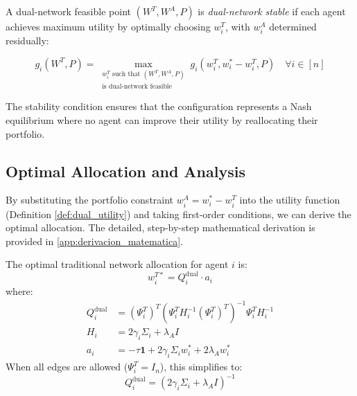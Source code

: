 \begin{definition}
\label{def:dual_stable}
A dual-network feasible point $(W^T, W^A, P)$ is \textit{dual-network stable} if each agent achieves maximum utility by optimally choosing $w_i^T$, with $w_i^A$ determined residually:

\begin{equation}
g_i(W^T, P) = \max_{\substack{w_i^T \text{ such that } (W^T, W^A, P) \\ \text{is dual-network feasible}}} g_i(w_i^T, w_i^* - w_i^T, P) \quad \forall i \in [n]
\label{eq:dual_stable_condition}
\end{equation}
\end{definition}
The stability condition ensures that the configuration represents a Nash equilibrium where no agent can improve their utility by reallocating their portfolio.


\subsection{Optimal Allocation and Analysis}
\label{sec:optimal_allocation}


By substituting the portfolio constraint $w_i^A = w_i^* - w_i^T$ into the utility function (Definition \ref{def:dual_utility}) and taking first-order conditions, we can derive the optimal allocation. The detailed, step-by-step mathematical derivation is provided in \ref{app:derivacion_matematica}.



\begin{proposition}
\label{prop:dual_optimal}
The optimal traditional network allocation for agent $i$ is:
\begin{equation}
w_i^{T*} = Q_i^{\text{dual}} \cdot a_i
\label{eq:dual_optimal_allocation}
\end{equation}
where:
\begin{align}
Q_i^{\text{dual}} &= (\Psi_i^T)^T(\Psi_i^T H_i^{-1} (\Psi_i^T)^T)^{-1}\Psi_i^T H_i^{-1} \label{eq:Q_dual_general}\\
H_i &= 2\gamma_i\Sigma_i + \lambda_A I \label{eq:H_dual_matrix}\\
a_i &= -\tau \mathbf{1} + 2\gamma_i\Sigma_i w_i^* + 2\lambda_A w_i^* \label{eq:dual_offset_vector}
\end{align}
When all edges are allowed ($\Psi_i^T = I_n$), this simplifies to:
\begin{equation}
Q_i^{\text{dual}} = (2\gamma_i\Sigma_i + \lambda_A I)^{-1}
\label{eq:Q_dual_simplified}
\end{equation}
\end{proposition}

